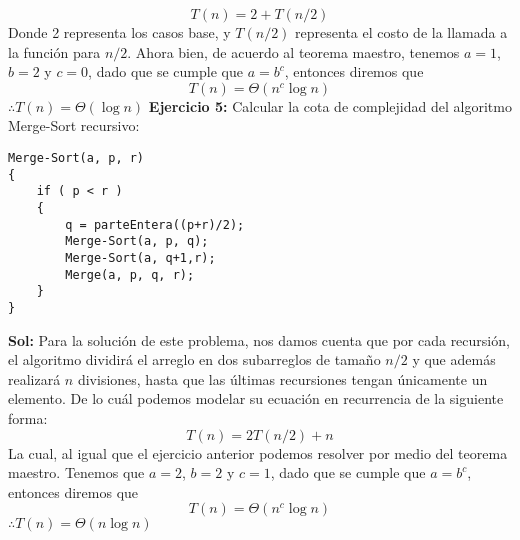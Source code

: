 \documentclass[12pt, letterpaper, oneside]{article}
\begin{document}
\[T(n)=2+T(n/2)\]
Donde 2 representa los casos base, y $T(n/2)$ representa el costo de la llamada a la función para $n/2$.
Ahora bien, de acuerdo al teorema maestro, tenemos $a=1$, $b=2$ y $c=0$, dado que se cumple que $a=b^{c}$, entonces diremos que
\[T(n)=\Theta(n^{c}\log{n})\]
\center
$\therefore T(n)=\Theta(\log{n})$
\newpage
\justify
\textbf{Ejercicio 5:} Calcular la cota de complejidad del algoritmo Merge-Sort recursivo:
\begin{lstlisting}
Merge-Sort(a, p, r)
{
	if ( p < r )
	{
		q = parteEntera((p+r)/2);
		Merge-Sort(a, p, q);
		Merge-Sort(a, q+1,r);
		Merge(a, p, q, r);
	}
} 
\end{lstlisting}
\textbf{Sol: }Para la solución de este problema, nos damos cuenta que por cada recursión, el algoritmo dividirá el arreglo en dos subarreglos de tamaño $n/2$ y que además realizará $n$ divisiones, hasta que las últimas recursiones tengan únicamente un elemento. De lo cuál podemos modelar su ecuación en recurrencia de la siguiente forma:
\[T(n)=2T(n/2)+n\]
La cual, al igual que el ejercicio anterior podemos resolver por medio del teorema maestro. Tenemos que $a=2$, $b=2$ y $c=1$, dado que se cumple que $a=b^{c}$, entonces diremos que
\[T(n)=\Theta(n^{c}\log{n})\]
\center
$\therefore T(n)=\Theta(n\log{n})$
\end{document}

